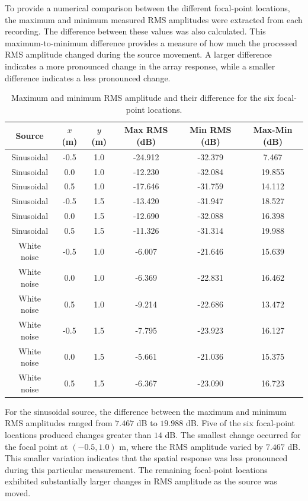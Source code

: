 To provide a numerical comparison between the different focal-point locations, the maximum and minimum measured RMS amplitudes were extracted from each recording. The difference between these values was also calculated. This maximum-to-minimum difference provides a measure of how much the processed RMS amplitude changed during the source movement. A larger difference indicates a more pronounced change in the array response, while a smaller difference indicates a less pronounced change.

\begin{table}[H]
\centering
\caption{Maximum and minimum RMS amplitude and their difference for the six focal-point locations.}
\label{tab:array_rms_results}
\begin{tabular}{c c c c c c}
\hline
Source & $x$ (m) & $y$ (m) & Max RMS (dB) & Min RMS (dB) & Max-Min (dB) \\
\hline
Sinusoidal & -0.5 & 1.0 & -24.912 & -32.379 & 7.467 \\
Sinusoidal & 0.0  & 1.0 & -12.230 & -32.084 & 19.855 \\
Sinusoidal & 0.5  & 1.0 & -17.646 & -31.759 & 14.112 \\
Sinusoidal & -0.5 & 1.5 & -13.420 & -31.947 & 18.527 \\
Sinusoidal & 0.0  & 1.5 & -12.690 & -32.088 & 16.398 \\
Sinusoidal & 0.5  & 1.5 & -11.326 & -31.314 & 19.988 \\
\hline
White noise & -0.5 & 1.0 & -6.007 & -21.646 & 15.639 \\
White noise & 0.0  & 1.0 & -6.369 & -22.831 & 16.462 \\
White noise & 0.5  & 1.0 & -9.214 & -22.686 & 13.472 \\
White noise & -0.5 & 1.5 & -7.795 & -23.923 & 16.127 \\
White noise & 0.0  & 1.5 & -5.661 & -21.036 & 15.375 \\
White noise & 0.5  & 1.5 & -6.367 & -23.090 & 16.723 \\
\hline
\end{tabular}
\end{table}

For the sinusoidal source, the difference between the maximum and minimum RMS amplitudes ranged from $7.467$ dB to $19.988$ dB. Five of the six focal-point locations produced changes greater than $14$ dB. The smallest change occurred for the focal point at $(-0.5,1.0)$ m, where the RMS amplitude varied by $7.467$ dB. This smaller variation indicates that the spatial response was less pronounced during this particular measurement. The remaining focal-point locations exhibited substantially larger changes in RMS amplitude as the source was moved.


